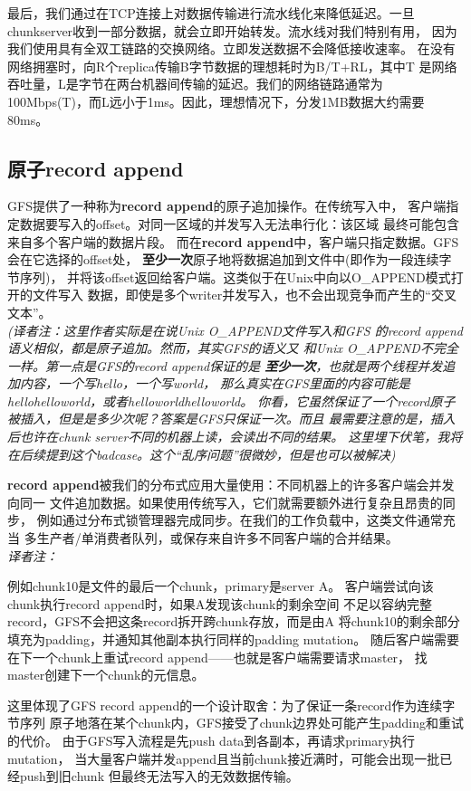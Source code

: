 最后，我们通过在TCP连接上对数据传输进行流水线化来降低延迟。一旦
chunkserver收到一部分数据，就会立即开始转发。流水线对我们特别有用，
因为我们使用具有全双工链路的交换网络。立即发送数据不会降低接收速率。
在没有网络拥塞时，向R个replica传输B字节数据的理想耗时为B/T+RL，其中T
是网络吞吐量，L是字节在两台机器间传输的延迟。我们的网络链路通常为
100Mbps(T)，而L远小于1ms。因此，理想情况下，分发1MB数据大约需要
80ms。

\subsection{原子\textbf{record append}}
GFS提供了一种称为\textbf{record append}的原子追加操作。在传统写入中，
客户端指定数据要写入的offset。对同一区域的并发写入无法串行化：该区域
最终可能包含来自多个客户端的数据片段。
而在\textbf{record append}中，客户端只指定数据。GFS会在它选择的offset处，
\textbf{至少一次}原子地将数据追加到文件中(即作为一段连续字节序列)，
并将该offset返回给客户端。这类似于在Unix中向以O\_APPEND模式打开的文件写入
数据，即使是多个writer并发写入，也不会出现竞争而产生的“交叉文本”。
\\\emph{(译者注：这里作者实际是在说Unix O\_APPEND文件写入和GFS
的record append语义相似，都是原子追加。然而，其实GFS的语义又
和Unix O\_APPEND不完全一样。第一点是GFS的record append保证的是
\textbf{至少一次}，也就是两个线程并发追加内容，一个写hello，一个写world，
那么真实在GFS里面的内容可能是hellohelloworld，或者helloworldhelloworld。
你看，它虽然保证了一个record原子被插入，但是是多少次呢？答案是GFS只保证一次。而且
最需要注意的是，插入后也许在chunk server不同的机器上读，会读出不同的结果。
这里埋下伏笔，我将在后续提到这个badcase。这个“乱序问题”很微妙，但是也可以被解决)}

\textbf{record append}被我们的分布式应用大量使用：不同机器上的许多客户端会并发向同一
文件追加数据。如果使用传统写入，它们就需要额外进行复杂且昂贵的同步，
例如通过分布式锁管理器完成同步。在我们的工作负载中，这类文件通常充当
多生产者/单消费者队列，或保存来自许多不同客户端的合并结果。
\\\begingroup\itshape
译者注：

例如chunk10是文件的最后一个chunk，primary是server A。
客户端尝试向该chunk执行record append时，如果A发现该chunk的剩余空间
不足以容纳完整record，GFS不会把这条record拆开跨chunk存放，而是由A
将chunk10的剩余部分填充为padding，并通知其他副本执行同样的padding mutation。
随后客户端需要在下一个chunk上重试record append——也就是客户端需要请求master，
找master创建下一个chunk的元信息。

这里体现了GFS record append的一个设计取舍：为了保证一条record作为连续字节序列
原子地落在某个chunk内，GFS接受了chunk边界处可能产生padding和重试的代价。
由于GFS写入流程是先push data到各副本，再请求primary执行mutation，
当大量客户端并发append且当前chunk接近满时，可能会出现一批已经push到旧chunk
但最终无法写入的无效数据传输。

